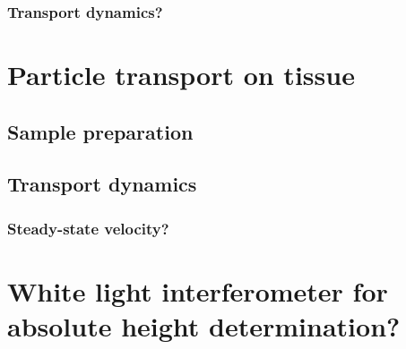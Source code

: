 \subsection{Transport dynamics?}

\chapter{Particle transport on tissue}
\section{Sample preparation}
\section{Transport dynamics}

\subsection{Steady-state velocity?}

\chapter{White light interferometer for absolute height determination?}




